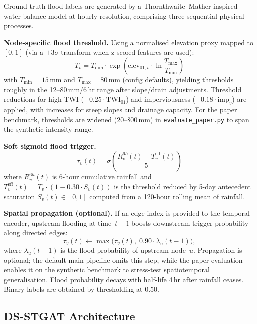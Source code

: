 \documentclass[10pt,twocolumn]{article}
\begin{document}
Ground-truth flood labels are generated by a
Thornthwaite--Mather-inspired water-balance model at hourly resolution,
comprising three sequential physical processes.

\smallskip\noindent\textbf{Node-specific flood threshold.}
Using a normalised elevation proxy mapped to $[0,1]$ (via a $\pm3\sigma$
transform when z-scored features are used):
\begin{equation}
  T_v = T_{\min} \cdot \exp\!\left(
    \mathrm{elev}_{01,v} \cdot \ln\!\frac{T_{\max}}{T_{\min}}
  \right)
  \label{eq:thresh}
\end{equation}
with $T_{\min}{=}15$\,mm and $T_{\max}{=}80$\,mm (config defaults), yielding
thresholds roughly in the 12--80\,mm/6\,hr range after slope/drain adjustments.
Threshold reductions for high TWI ($-0.25\cdot\mathrm{TWI}_{01}$) and
imperviousness ($-0.18\cdot\mathrm{imp}_v$) are applied, with increases
for steep slopes and drainage capacity.
For the paper benchmark, thresholds are widened (20--800\,mm) in
\texttt{evaluate\_paper.py} to span the synthetic intensity range.

\smallskip\noindent\textbf{Soft sigmoid flood trigger.}
\begin{equation}
  \tau_v(t) = \sigma\!\left(
    \frac{R_v^{6h}(t) - T_v^{\mathrm{eff}}(t)}{5}
  \right)
  \label{eq:trigger}
\end{equation}
where $R_v^{6h}(t)$ is 6-hour cumulative rainfall and
$T_v^{\mathrm{eff}}(t) = T_v\cdot(1-0.30\cdot S_v(t))$ is the
threshold reduced by 5-day antecedent saturation $S_v(t)\in[0,1]$
computed from a 120-hour rolling mean of rainfall.

\smallskip\noindent\textbf{Spatial propagation (optional).}
If an edge index is provided to the temporal encoder, upstream flooding at
time~$t{-}1$ boosts downstream trigger probability along directed edges:
\begin{equation}
  \tau_v(t) \leftarrow \max\bigl(\tau_v(t),\; 0.90\cdot\lambda_u(t{-}1)\bigr),
  \label{eq:prop}
\end{equation}
where $\lambda_u(t{-}1)$ is the flood probability of upstream node~$u$.
Propagation is optional; the default main pipeline omits this step, while the
paper evaluation enables it on the synthetic benchmark to stress-test
spatiotemporal generalisation.
Flood probability decays with half-life 4\,hr after rainfall ceases.
Binary labels are obtained by thresholding at 0.50.

\subsection{DS-STGAT Architecture}
\label{sec:arch}
\end{document}
